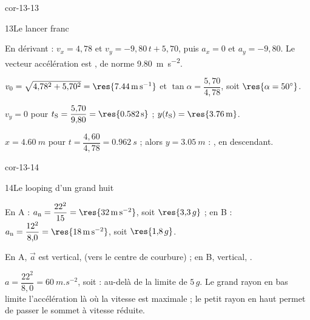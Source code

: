 \begin{blocLivre}{cor-13-13}
\begin{corrige}{13}{Le lancer franc}
\begin{questions}
\item En dérivant : $v_x=4{,}78$ et $v_y=-9{,}80\,t+5{,}70$, puis $a_x=0$ et $a_y=-9{,}80$. Le vecteur accélération est
, de norme \qty{9,80}{m.s^{-2}}.
\item $v_0=\sqrt{4{,}78^2+5{,}70^2}=\res{\qty{7,44}{m.s^{-1}}}$ et $\tan\alpha=\dfrac{5{,}70}{4{,}78}$, soit $\res{\alpha=50^\circ}$.
\item $v_y=0$ pour $t_\mathrm{S}=\dfrac{5{,}70}{9{,}80}=\res{\qty{0,582}{s}}$ ; $y(t_\mathrm{S})=\res{\qty{3,76}{m}}$.
\item $x=\qty{4,60}{m}$ pour $t=\dfrac{4{,}60}{4{,}78}=\qty{0,962}{s}$ ; alors $y=\qty{3,05}{m}$ : , en descendant.
\end{questions}
\end{corrige}
\end{blocLivre}
\begin{blocLivre}{cor-13-14}
\begin{corrige}{14}{Le looping d'un grand huit}
\begin{questions}
\item En A : $a_\mathrm{n}=\dfrac{22^2}{15}=\res{\qty{32}{m.s^{-2}}}$, soit $\res{3{,}3\,g}$ ; en B :
$a_\mathrm{n}=\dfrac{12^2}{8{,}0}=\res{\qty{18}{m.s^{-2}}}$, soit $\res{1{,}8\,g}$.
\item En A, $\vec{a}$ est vertical,  (vers le centre de courbure) ; en B, vertical, .
\item $a=\dfrac{22^2}{8{,}0}=\qty{60}{m.s^{-2}}$, soit  : au-delà de la limite de $5\,g$. Le grand rayon en bas
limite l'accélération là où la vitesse est maximale ; le petit rayon en haut permet de passer le sommet à vitesse
réduite.
\end{questions}
\end{corrige}
\end{blocLivre}
